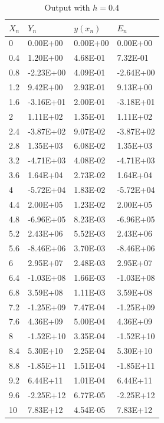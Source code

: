 \documentclass[10pt,a4paper]{report}
\begin{document}
\begin{minipage}[b]{0.45\linewidth}
\centering
\begin{table}[H]
\begin{tabular}{|l|l|l|l|}
\hline
$X_n$ & $Y_n$      & $y(x_n)$  & $E_n$      \\ \hline
0    & 0.00E+00  & 0.00E+00 & 0.00E+00  \\ \hline
0.4  & 1.20E+00  & 4.68E-01 & 7.32E-01  \\ \hline
0.8  & -2.23E+00 & 4.09E-01 & -2.64E+00 \\ \hline
1.2  & 9.42E+00  & 2.93E-01 & 9.13E+00  \\ \hline
1.6  & -3.16E+01 & 2.00E-01 & -3.18E+01 \\ \hline
2    & 1.11E+02  & 1.35E-01 & 1.11E+02  \\ \hline
2.4  & -3.87E+02 & 9.07E-02 & -3.87E+02 \\ \hline
2.8  & 1.35E+03  & 6.08E-02 & 1.35E+03  \\ \hline
3.2  & -4.71E+03 & 4.08E-02 & -4.71E+03 \\ \hline
3.6  & 1.64E+04  & 2.73E-02 & 1.64E+04  \\ \hline
4    & -5.72E+04 & 1.83E-02 & -5.72E+04 \\ \hline
4.4  & 2.00E+05  & 1.23E-02 & 2.00E+05  \\ \hline
4.8  & -6.96E+05 & 8.23E-03 & -6.96E+05 \\ \hline
5.2  & 2.43E+06  & 5.52E-03 & 2.43E+06  \\ \hline
5.6  & -8.46E+06 & 3.70E-03 & -8.46E+06 \\ \hline
6    & 2.95E+07  & 2.48E-03 & 2.95E+07  \\ \hline
6.4  & -1.03E+08 & 1.66E-03 & -1.03E+08 \\ \hline
6.8  & 3.59E+08  & 1.11E-03 & 3.59E+08  \\ \hline
7.2  & -1.25E+09 & 7.47E-04 & -1.25E+09 \\ \hline
7.6  & 4.36E+09  & 5.00E-04 & 4.36E+09  \\ \hline
8    & -1.52E+10 & 3.35E-04 & -1.52E+10 \\ \hline
8.4  & 5.30E+10  & 2.25E-04 & 5.30E+10  \\ \hline
8.8  & -1.85E+11 & 1.51E-04 & -1.85E+11 \\ \hline
9.2  & 6.44E+11  & 1.01E-04 & 6.44E+11  \\ \hline
9.6  & -2.25E+12 & 6.77E-05 & -2.25E+12 \\ \hline
10   & 7.83E+12  & 4.54E-05 & 7.83E+12  \\ \hline
\end{tabular}
\caption{Output with $h=0.4$}
\end{table}
\end{minipage}
\end{document}
